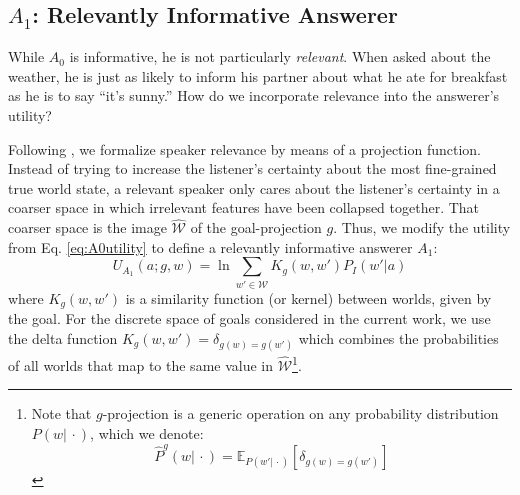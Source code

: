 \documentclass[12pt, floatsintext, jou]{apa6}
\newcommand{\E}[2]{\ensuremath{\mathbb{E}_{#1}\left [#2 \right]}}
\begin{document}

\subsection{$A_1$: Relevantly Informative Answerer}

While $A_0$ is informative, he is not particularly \emph{relevant}. When asked about the weather, he is just as likely to inform his partner about what he ate for breakfast as he is to say ``it's sunny.'' How do we incorporate relevance into the answerer's utility? 

Following , we formalize speaker relevance by means of a projection function. Instead of trying to increase the listener's certainty about the most fine-grained true world state, a relevant speaker only cares about the listener's certainty in a coarser space in which irrelevant features have been collapsed together. That coarser space is the image $\widehat{\mathcal{W}}$ of the goal-projection $g$.
Thus, we modify the utility from Eq. \ref{eq:A0utility} to define a relevantly informative answerer $A_1$: 
$$U_{A_1}(a; g, w) = \ln \sum_{w' \in \mathcal{W}} K_g(w, w') P_I(w' | a)$$
where $K_g(w,w')$ is a similarity function (or kernel) between worlds, given by the goal. For the discrete space of goals considered in the current work, we use the delta function $K_g(w,w') = \delta_{g(w)=g(w')}$ which combines the probabilities of all worlds that map to the same value in $\widehat{\mathcal{W}}$\footnote{Note that $g$-projection is a generic operation on any probability distribution $P(w|\,\cdot)$, which we denote: 
$$\widehat{P}^g(w|\, \cdot) = \E{P(w'|\, \cdot)}{\delta_{g(w) = g(w')}}$$}.
\end{document}
